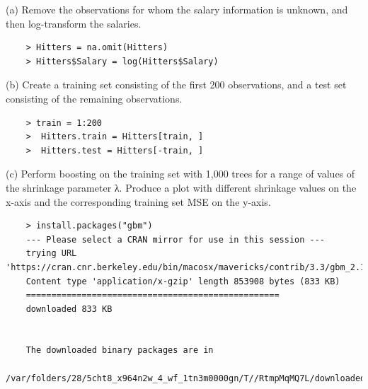 \documentclass{article}
\begin{document}
(a) Remove the observations for whom the salary information is unknown, and then log-transform the salaries.\\

\begin{program}
	\begin{verbatim}
	> Hitters = na.omit(Hitters)
	> Hitters$Salary = log(Hitters$Salary)
	\end{verbatim}
\end{program}


\newpage

(b) Create a training set consisting of the first 200 observations, and a test set consisting of the remaining observations. \\

\begin{program}
	\begin{verbatim}
	> train = 1:200
	>  Hitters.train = Hitters[train, ]
	>  Hitters.test = Hitters[-train, ]
	\end{verbatim}
\end{program}

(c) Perform boosting on the training set with 1,000 trees for a range of values of the shrinkage parameter λ. Produce a plot with different shrinkage values on the x-axis and the corresponding training set MSE on the y-axis. \\

\begin{program}
	\begin{verbatim}
	> install.packages("gbm")
	--- Please select a CRAN mirror for use in this session ---
	trying URL 'https://cran.cnr.berkeley.edu/bin/macosx/mavericks/contrib/3.3/gbm_2.1.1.tgz'
	Content type 'application/x-gzip' length 853908 bytes (833 KB)
	==================================================
	downloaded 833 KB
	
	
	The downloaded binary packages are in
	/var/folders/28/5cht8_x964n2w_4_wf_1tn3m0000gn/T//RtmpMqMQ7L/downloaded_packages
	\end{verbatim}
\end{program}
\end{document}
